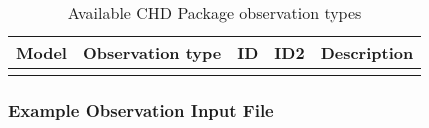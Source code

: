 \begin{longtable}{p{2cm} p{2.75cm} p{2cm} p{1.25cm} p{7cm}}
\caption{Available CHD Package observation types} \tabularnewline

\hline
\hline
\textbf{Model} & \textbf{Observation type} & \textbf{ID} & \textbf{ID2} & \textbf{Description} \\
\hline
\endhead

\hline
\endfoot


\label{table:gwf-chdobstype}
\end{longtable}

\vspace{5mm}
\subsubsection{Example Observation Input File}


